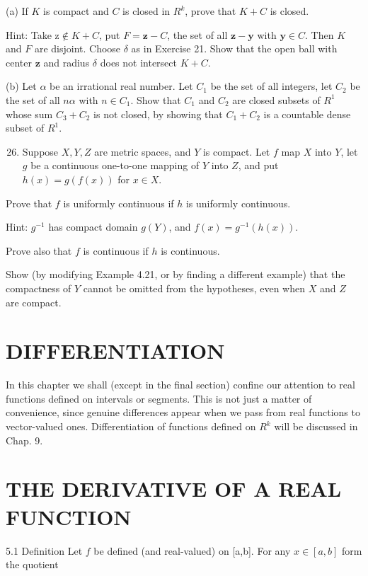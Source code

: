 \documentclass[10pt]{article}
\begin{document}
(a) If $K$ is compact and $C$ is closed in $R^{k}$, prove that $K+C$ is closed.

Hint: Take $\mathrm{z} \notin K+C$, put $F=\mathbf{z}-C$, the set of all $\mathbf{z}-\mathbf{y}$ with $\mathbf{y} \in C$. Then $K$ and $F$ are disjoint. Choose $\delta$ as in Exercise 21. Show that the open ball with center $\mathbf{z}$ and radius $\delta$ does not intersect $K+C$.

(b) Let $\alpha$ be an irrational real number. Let $C_{1}$ be the set of all integers, let $C_{2}$ be the set of all $n \alpha$ with $n \in C_{1}$. Show that $C_{1}$ and $C_{2}$ are closed subsets of $R^{1}$ whose sum $C_{3}+C_{2}$ is not closed, by showing that $C_{1}+C_{2}$ is a countable dense subset of $R^{1}$.

\begin{enumerate}
  \setcounter{enumi}{25}
  \item Suppose $X, Y, Z$ are metric spaces, and $Y$ is compact. Let $f$ map $X$ into $Y$, let $g$ be a continuous one-to-one mapping of $Y$ into $Z$, and put $h(x)=g(f(x))$ for $x \in X$.
\end{enumerate}

Prove that $f$ is uniformly continuous if $h$ is uniformly continuous.

Hint: $g^{-1}$ has compact domain $g(Y)$, and $f(x)=g^{-1}(h(x))$.

Prove also that $f$ is continuous if $h$ is continuous.

Show (by modifying Example 4.21, or by finding a different example) that the compactness of $Y$ cannot be omitted from the hypotheses, even when $X$ and $Z$ are compact.

\section{DIFFERENTIATION}
In this chapter we shall (except in the final section) confine our attention to real functions defined on intervals or segments. This is not just a matter of convenience, since genuine differences appear when we pass from real functions to vector-valued ones. Differentiation of functions defined on $R^{k}$ will be discussed in Chap. 9.

\section{THE DERIVATIVE OF A REAL FUNCTION}
5.1 Definition Let $f$ be defined (and real-valued) on [a,b]. For any $x \in[a, b]$ form the quotient
\end{document}
